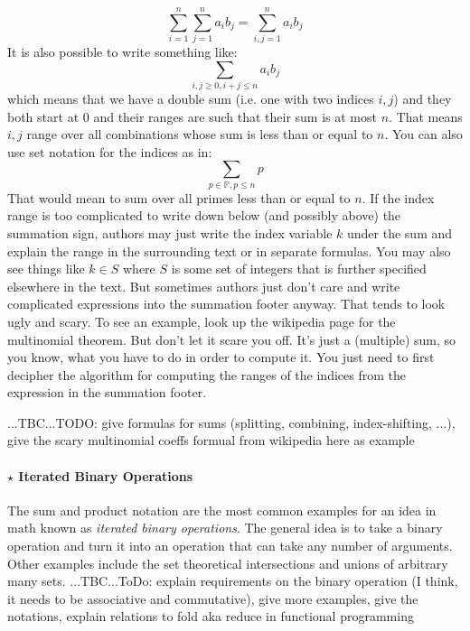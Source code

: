 \begin{equation}
 \sum_{i=1}^{n} \sum_{j=1}^n  a_i b_j = \sum_{i,j=1}^{n} a_i b_j
\end{equation}
It is also possible to write something like:
\begin{equation}
 \sum_{i,j \geq 0, i+j \leq n} a_i b_j
\end{equation}
which means that we have a double sum (i.e. one with two indices $i,j$) and they both start at $0$ and their ranges are such that their sum is at most $n$. That means $i,j$ range over all combinations whose sum is less than or equal to $n$. You can also use set notation for the indices as in:
\begin{equation}
 \sum_{p \in \mathbb{P}, p \leq n} p
\end{equation}
That would mean to sum over all primes less than or equal to $n$. If the index range is too complicated to write down below (and possibly above) the summation sign, authors may just write the index variable $k$ under the sum and explain the range in the surrounding text or in separate formulas. You may also see things like $k \in S$ where $S$ is some set of integers that is further specified elsewhere in the text. But sometimes authors just don't care and write complicated expressions into the summation footer anyway. That tends to look ugly and scary. To see an example, look up the wikipedia page for the multinomial theorem. But don't let it scare you off. It's just a (multiple) sum, so you know, what you have to do in order to compute it. You just need to first decipher the algorithm for computing the ranges of the indices from the expression in the summation footer. 

...TBC...TODO: give formulas for sums (splitting, combining, index-shifting, ...), give the scary multinomial coeffs formual from wikipedia here as example



\label{Sec:IteratedBinaryOperations}

\paragraph{$\star$ Iterated Binary Operations}
The sum and product notation are the most common examples for an idea in math known as \emph{iterated binary operations}. The general idea is to take a binary operation and turn it into an operation that can take any number of arguments. Other examples include the set theoretical intersections and unions of arbitrary many sets. ...TBC...ToDo: explain requirements on the binary operation (I think, it needs to be associative and commutative), give more examples, give the notations, explain relations to fold aka reduce in functional programming

